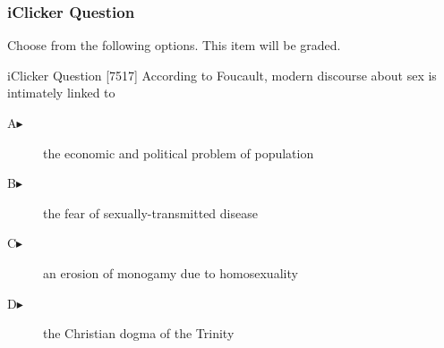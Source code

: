 \begin{frame}
  \frametitle{iClicker Question}
Choose from the following options. This item will be graded.
\begin{block}{iClicker Question}
[7517] According to Foucault, modern discourse about sex is intimately linked to
\end{block}
\begin{description}
\item[A\hspace{.2in}$\blacktriangleright$] the economic and political problem of population
\item[B\hspace{.2in}$\blacktriangleright$] the fear of sexually-transmitted disease
\item[C\hspace{.2in}$\blacktriangleright$] an erosion of monogamy due to homosexuality
\item[D\hspace{.2in}$\blacktriangleright$] the Christian dogma of the Trinity
\end{description}
\end{frame}
